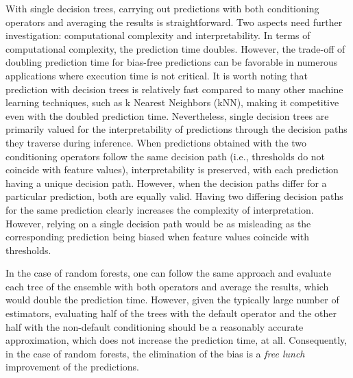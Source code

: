 \documentclass[sn-mathphys]{sn-jnl}%
\theoremstyle{thmstyleone}%
\theoremstyle{thmstyletwo}%
\theoremstyle{thmstylethree}%
\begin{document}
With single decision trees, carrying out predictions with both conditioning operators and averaging the results is straightforward. Two aspects need further investigation: computational complexity and interpretability. In terms of computational complexity, the prediction time doubles. However, the trade-off of doubling prediction time for bias-free predictions can be favorable in numerous applications where execution time is not critical. It is worth noting that prediction with decision trees is relatively fast compared to many other machine learning techniques, such as k Nearest Neighbors (kNN), making it competitive even with the doubled prediction time.
Nevertheless, single decision trees are primarily valued for the interpretability of predictions through the decision paths they traverse during inference. When predictions obtained with the two conditioning operators follow the same decision path (i.e., thresholds do not coincide with feature values), interpretability is preserved, with each prediction having a unique decision path. However, when the decision paths differ for a particular prediction, both are equally valid. Having two differing decision paths for the same prediction clearly increases the complexity of interpretation. However, relying on a single decision path would be as misleading as the corresponding prediction being biased when feature values coincide with thresholds.



In the case of random forests, one can follow the same approach and evaluate each tree of the ensemble with both operators and average the results, which would double the prediction time. However, given the typically large number of estimators, evaluating half of the trees with the default operator and the other half with the non-default conditioning should be a reasonably accurate approximation, which does not increase the prediction time, at all. Consequently, in the case of random forests, the elimination of the bias is a \emph{free lunch} improvement of the predictions. 

\end{document}
